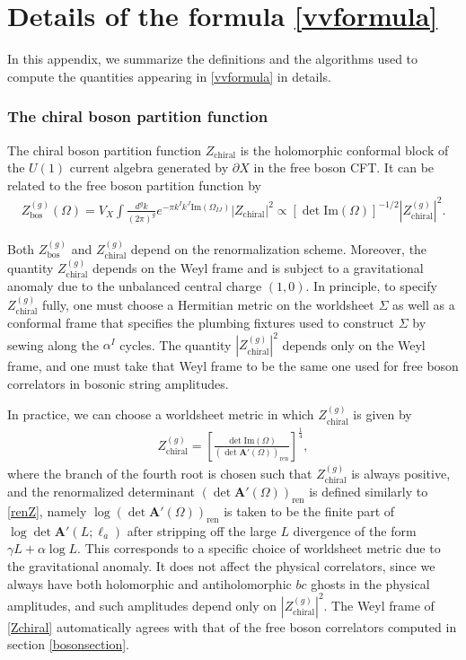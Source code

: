 \documentclass[12pt]{article}
\def\ie{\begin{equation}\begin{aligned}}
\def\fe{\end{aligned}\end{equation}}
\numberwithin{equation}{section}
\begin{document}
\section{Details of the formula \eqref{vvformula}}

\label{holodataappendix}

In this appendix, we summarize the definitions and the algorithms used to compute the quantities appearing in \eqref{vvformula} in details. 

\subsubsection*{The chiral boson partition function}

The chiral boson partition function $Z_{\text{chiral}}$ is the holomorphic conformal block of the $U(1)$ current algebra generated by $\partial X$ in the free boson CFT. It can be related to the free boson partition function by
\ie
\label{eq:boschiralrelation}
Z_\text{bos}^{(g)}(\Omega) = V_X\int \frac{d^gk}{(2\pi)^g} e^{-\pi k^I k^J\mathrm{Im}(\Omega_{IJ})}|Z_\text{chiral}|^2 \propto \left[\det \mathrm{Im}(\Omega)\right]^{-1/2}|Z_\text{chiral}^{(g)}|^2.
\fe

Both $Z_\text{bos}^{(g)}$ and $Z_\text{chiral}^{(g)}$ depend on the renormalization scheme. Moreover, the quantity $Z_{\text{chiral}}^{(g)}$ depends on the Weyl frame and is subject to a gravitational anomaly due to the unbalanced central charge $(1,0)$. In principle, to specify $Z_{\text{chiral}}^{(g)}$ fully, one must choose a Hermitian metric on the worldsheet $\Sigma$ as well as a conformal frame that specifies the plumbing fixtures used to construct $\Sigma$ by sewing along the $\alpha^I$ cycles. The quantity $|Z_\text{chiral}^{(g)}|^2$ depends only on the Weyl frame, and one must take that Weyl frame to be the same one used for free boson correlators in bosonic string amplitudes.

In practice, we can choose a worldsheet metric in which $Z_\text{chiral}^{(g)}$ is given by
\ie \label{Zchiral}
Z_\text{chiral}^{(g)} = \left[\frac{\det \mathrm{Im}(\Omega)}{\left(\det \mathbf{A}'(\Omega)\right)_\text{ren}}\right]^{\frac{1}{4}},
\fe
where the branch of the fourth root is chosen such that $Z_\text{chiral}^{(g)}$ is always positive, and the renormalized determinant $\left(\det \mathbf{A}'(\Omega)\right)_\text{ren}$ is defined similarly to \eqref{renZ}, namely $\log\left(\det \mathbf{A}'(\Omega)\right)_\text{ren}$ is taken to be the finite part of $\log \det \mathbf{A}'(L;\ell_a)$ after stripping off the large $L$ divergence of the form $\gamma L+\alpha\log L$. This corresponds to a specific choice of worldsheet metric due to the gravitational anomaly. It does not affect the physical correlators, since we always have both holomorphic and antiholomorphic $bc$ ghosts in the physical amplitudes, and such amplitudes depend only on $|Z_\text{chiral}^{(g)}|^2$. The Weyl frame of \eqref{Zchiral} automatically agrees with that of the free boson correlators computed in section \ref{bosonsection}.
\end{document}

